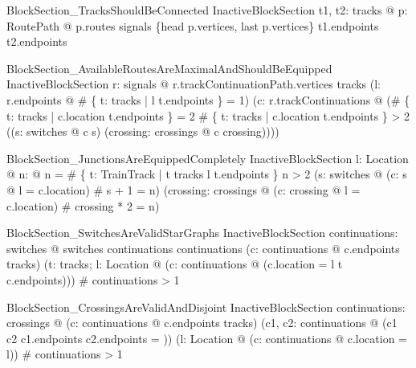 \begin{schema}{BlockSection\_TracksShouldBeConnected}
  InactiveBlockSection
\where
  \forall  t1, t2: tracks @ \exists  p: RoutePath @ p.routes \subseteq  \dom  signals \land  \{head p.vertices, last p.vertices\} \subseteq  t1.endpoints \cup  t2.endpoints
\end{schema}

\begin{schema}{BlockSection\_AvailableRoutesAreMaximalAndShouldBeEquipped}
  InactiveBlockSection
\where
  \forall  r: \dom  signals @ \ran  r.trackContinuationPath.vertices \subseteq  tracks \land  (\forall  l: r.endpoints @ \# \{  t: tracks | l \in  t.endpoints \} = 1) \land  (\forall  c: r.trackContinuations @ (\# \{  t: tracks | c.location \in  t.endpoints \} = 2 \lor  \# \{  t: tracks | c.location \in  t.endpoints \} > 2 \land  ((\exists  s: \dom  switches @ c \in  s) \lor  (\exists  crossing: crossings @ c \in  crossing))))
\end{schema}

\begin{schema}{BlockSection\_JunctionsAreEquippedCompletely}
  InactiveBlockSection
\where
  \forall  l: Location @ \exists  n: \nat  @ n = \# \{  t: TrainTrack | t \in  tracks \land  l \in  t.endpoints \} \land  n > 2 \implies  (\exists  s: \dom  switches @ (\exists  c: s @ l = c.location) \land  \# s + 1 = n) \lor  (\exists  crossing: crossings @ (\exists  c: crossing @ l = c.location) \land  \# crossing * 2 = n)
\end{schema}

\begin{schema}{BlockSection\_SwitchesAreValidStarGraphs}
  InactiveBlockSection
\where
  \forall  continuations: \dom  switches @ switches continuations \in  continuations \land  (\forall  c: continuations @ c.endpoints \subseteq  tracks) \land  (\exists  t: tracks; l: Location @ (\forall  c: continuations @ (c.location = l \land  t \in  c.endpoints))) \land  \# continuations > 1
\end{schema}

\begin{schema}{BlockSection\_CrossingsAreValidAndDisjoint}
  InactiveBlockSection
\where
  \forall  continuations: crossings @ (\forall  c: continuations @ c.endpoints \subseteq  tracks) \land  (\forall  c1, c2: continuations @ (c1 \neq  c2 \implies  c1.endpoints \cap  c2.endpoints = \emptyset)) \land  (\exists  l: Location @ (\forall  c: continuations @ c.location = l)) \land  \# continuations > 1
\end{schema}

